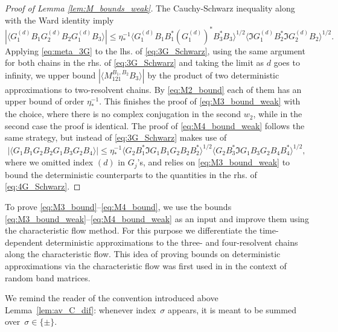 \documentclass[10pt]{amsart}
\numberwithin{equation}{section}
\begin{document}
\begin{proof}[Proof of Lemma \ref{lem:M_bounds_weak}]
The Cauchy-Schwarz inequality along with the Ward identity imply
\begin{equation}
\left\vert\big\langle G_1^{(d)}B_1G_2^{(d)}B_2G_1^{(d)}B_3\big\rangle\right\vert \le \eta_*^{-1}\big\langle G_1^{(d)}B_1B_1^*(G_1^{(d)})^*B_3^*B_3\big\rangle^{1/2}\big\langle \Im G_1^{(d)} B_2^*\Im G_2^{(d)}B_2\big\rangle^{1/2}.
\label{eq:3G_Schwarz}
\end{equation}
Applying \eqref{eq:meta_3G} to the lhs. of \eqref{eq:3G_Schwarz}, using the same argument for both chains in the rhs. of \eqref{eq:3G_Schwarz} and taking the limit as $d$ goes to infinity, we upper bound $|\langle M_{121}^{B_1,B_2}B_3\rangle|$ by the product of two deterministic approximations to two-resolvent chains. By \eqref{eq:M2_bound} each of them has an upper bound of order $\eta_*^{-1}$. This finishes the proof of \eqref{eq:M3_bound_weak} with the choice, where there is no complex conjugation in the second $w_2$, while in the second case the proof is identical. The proof of \eqref{eq:M4_bound_weak} follows the same strategy, but instead of \eqref{eq:3G_Schwarz} makes use of
\begin{equation}
\left\vert \langle G_1B_1G_2B_2G_1B_3G_2B_4\rangle\right\vert \le \eta_*^{-1}\langle G_2B_1^*\Im G_1B_1G_2B_2B_2^*\rangle^{1/2}\langle G_2B_3^*\Im G_1B_3G_2B_4B_4^*\rangle^{1/2}, 
\label{eq:4G_Schwarz}
\end{equation} 
where we omitted index $(d)$ in $G_j$'s, and relies on \eqref{eq:M3_bound_weak} to bound the deterministic counterparts to the quantities in the rhs. of \eqref{eq:4G_Schwarz}.
\end{proof}


To prove \eqref{eq:M3_bound}--\eqref{eq:M4_bound}, we use the bounds \eqref{eq:M3_bound_weak}--\eqref{eq:M4_bound_weak} as an input and improve them using the characteristic flow method. For this purpose we differentiate the time-dependent deterministic approximations to the three- and four-resolvent chains along the characteristic flow. This idea of proving bounds on deterministic approximations via the characteristic flow was first used in \cite[Section~11.2]{RBM_Zigzag} in the context of random band matrices.

We remind the reader of the convention introduced above Lemma~\ref{lem:av_C_dif}: whenever index~$\sigma$ appears, it is meant to be summed over~$\sigma\in\{\pm\}$. 
\end{document}
